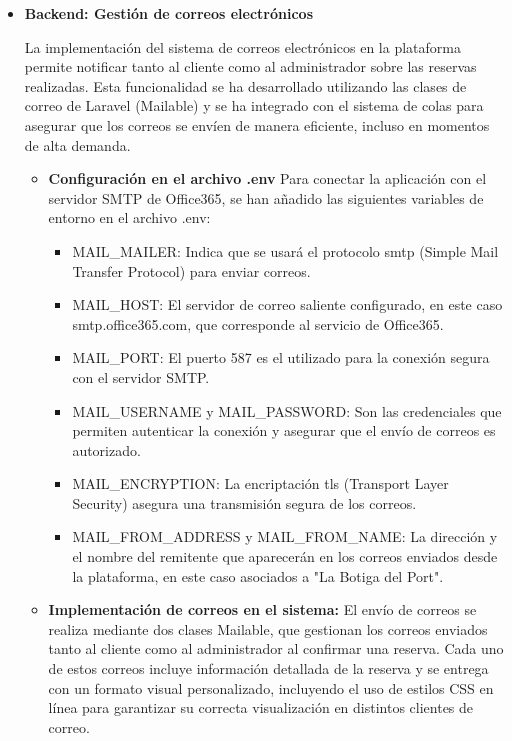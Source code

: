 \begin{itemize} \item \textbf{Backend: Gestión de correos electrónicos}

    La implementación del sistema de correos electrónicos en la plataforma permite notificar tanto al cliente como al administrador sobre las reservas realizadas. Esta funcionalidad se ha desarrollado utilizando las clases de correo de Laravel (Mailable) y se ha integrado con el sistema de colas para asegurar que los correos se envíen de manera eficiente, incluso en momentos de alta demanda.

\begin{itemize}
    \item \textbf{Configuración en el archivo .env} Para conectar la aplicación con el servidor SMTP de Office365, se han añadido las siguientes variables de entorno en el archivo .env:
    \begin{itemize}
         \item MAIL\_MAILER: Indica que se usará el protocolo smtp (Simple Mail Transfer Protocol) para enviar correos.

         \item MAIL\_HOST: El servidor de correo saliente configurado, en este caso smtp.office365.com, que corresponde al servicio de Office365.

         \item MAIL\_PORT: El puerto 587 es el utilizado para la conexión segura con el servidor SMTP.

         \item MAIL\_USERNAME y MAIL\_PASSWORD: Son las credenciales que permiten autenticar la conexión y asegurar que el envío de correos es autorizado.

         \item MAIL\_ENCRYPTION: La encriptación tls (Transport Layer Security) asegura una transmisión segura de los correos.

         \item MAIL\_FROM\_ADDRESS y MAIL\_FROM\_NAME: La dirección y el nombre del remitente que aparecerán en los correos enviados desde la plataforma, en este caso asociados a "La Botiga del Port".
           
    \end{itemize}

     \item \textbf{Implementación de correos en el sistema: } El envío de correos se realiza mediante dos clases Mailable, que gestionan los correos enviados tanto al cliente como al administrador al confirmar una reserva. Cada uno de estos correos incluye información detallada de la reserva y se entrega con un formato visual personalizado, incluyendo el uso de estilos CSS en línea para garantizar su correcta visualización en distintos clientes de correo.


\end{itemize}
\end{itemize}

